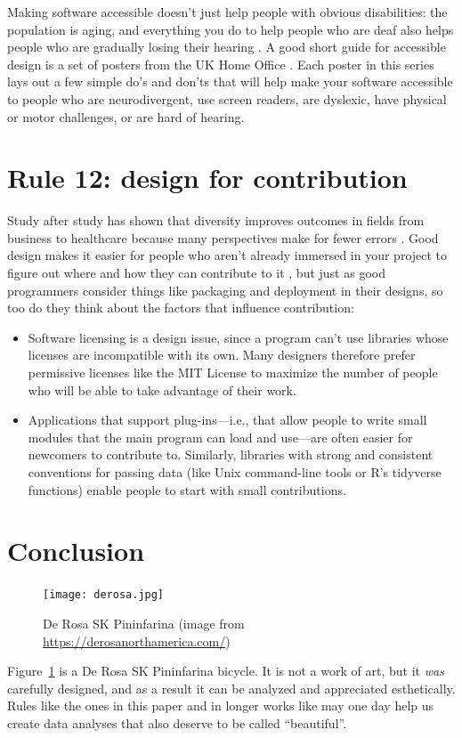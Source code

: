 \documentclass[10pt,letterpaper]{article}
\begin{document}
Making software accessible doesn't just help people with obvious disabilities:
the population is aging,
and everything you do to help people who are deaf also helps people
who are gradually losing their hearing \cite{Johnson2017}.
A good short guide for accessible design is a set of posters from the UK Home Office \cite{UKHO}.
Each poster in this series lays out a few simple do's and don'ts that will help make your software accessible
to people who are neurodivergent,
use screen readers,
are dyslexic,
have physical or motor challenges, or are hard of hearing.

\section*{Rule 12: design for contribution}

Study after study has shown that diversity improves outcomes in fields from business to healthcare
because many perspectives make for fewer errors \cite{Gompers2018,Gomez2019}.
Good design makes it easier for people who aren't already immersed in your project
to figure out where and how they can contribute to it \cite{Sholler2019},
but just as good programmers consider things like packaging and deployment in their designs,
so too do they think about the factors that influence contribution:

\begin{itemize}

\item
  Software licensing is a design issue,
  since a program can't use libraries whose licenses are incompatible with its own.
  Many designers therefore prefer permissive licenses like the MIT License
  to maximize the number of people who will be able to take advantage of their work.

\item
  Applications that support plug-ins---i.e.,
  that allow people to write small modules that the main program can load and use---are
  often easier for newcomers to contribute to.
  Similarly,
  libraries with strong and consistent conventions for passing data
  (like Unix command-line tools or R's tidyverse functions)
  enable people to start with small contributions.

\end{itemize}

\section*{Conclusion}

\begin{figure}
  \centering
  \texttt{[image: derosa.jpg]}
  \caption{De Rosa SK Pininfarina (image from \url{https://derosanorthamerica.com/})}
  \label{bicycle}
\end{figure}

Figure~\ref{bicycle} is a De Rosa SK Pininfarina bicycle.
It is not a work of art,
but it \emph{was} carefully designed,
and as a result it can be analyzed and appreciated esthetically.
Rules like the ones in this paper
and in longer works like \cite{Budgen2020}
may one day help us create data analyses that also deserve to be called ``beautiful''.


\end{document}
